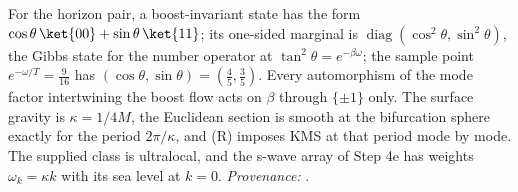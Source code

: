 For the horizon pair, a boost-invariant state has the form $\cos\theta\,\ket{00} + \sin\theta\,\ket{11}$; its one-sided marginal is $\operatorname{diag}(\cos^{2}\theta, \sin^{2}\theta)$, the Gibbs state for the number operator at $\tan^{2}\theta = e^{-\beta\omega}$; the sample point $e^{-\omega/T} = \tfrac{9}{16}$ has $(\cos\theta, \sin\theta) = (\tfrac45, \tfrac35)$. Every automorphism of the mode factor intertwining the boost flow acts on $\beta$ through $\{\pm 1\}$ only. The surface gravity is $\kappa = 1/4M$, the Euclidean section is smooth at the bifurcation sphere exactly for the period $2\pi/\kappa$, and (R) imposes KMS at that period mode by mode. The supplied class is ultralocal, and the s-wave array of Step 4e has weights $\omega_{k} = \kappa k$ with its sea level at $k = 0$. \emph{Provenance:} \cite[Lem.~7.2, Thm.~7.3, Thm.~7.16, Prop.~7.18, Prem.~7.19, Prop.~7.25, Rem.~7.26, Prem.~7.30, Rem.~7.33, Prem.~8.1, Thm.~C.8, Rem.~C.9, Prop.~A.2]{ButlerT5}.
